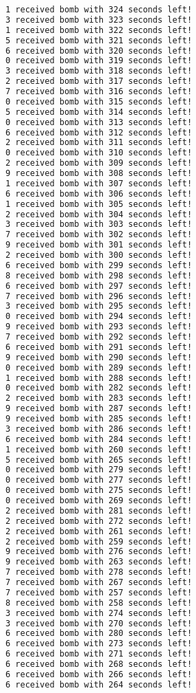 \documentclass{article}
\begin{document}
\begin{lstlisting}[language=bash]
1 received bomb with 324 seconds left!
3 received bomb with 323 seconds left!
1 received bomb with 322 seconds left!
5 received bomb with 321 seconds left!
6 received bomb with 320 seconds left!
0 received bomb with 319 seconds left!
3 received bomb with 318 seconds left!
2 received bomb with 317 seconds left!
7 received bomb with 316 seconds left!
0 received bomb with 315 seconds left!
5 received bomb with 314 seconds left!
0 received bomb with 313 seconds left!
6 received bomb with 312 seconds left!
2 received bomb with 311 seconds left!
0 received bomb with 310 seconds left!
2 received bomb with 309 seconds left!
9 received bomb with 308 seconds left!
1 received bomb with 307 seconds left!
6 received bomb with 306 seconds left!
1 received bomb with 305 seconds left!
2 received bomb with 304 seconds left!
3 received bomb with 303 seconds left!
7 received bomb with 302 seconds left!
9 received bomb with 301 seconds left!
2 received bomb with 300 seconds left!
6 received bomb with 299 seconds left!
8 received bomb with 298 seconds left!
6 received bomb with 297 seconds left!
7 received bomb with 296 seconds left!
3 received bomb with 295 seconds left!
0 received bomb with 294 seconds left!
9 received bomb with 293 seconds left!
7 received bomb with 292 seconds left!
6 received bomb with 291 seconds left!
9 received bomb with 290 seconds left!
0 received bomb with 289 seconds left!
1 received bomb with 288 seconds left!
0 received bomb with 282 seconds left!
2 received bomb with 283 seconds left!
9 received bomb with 287 seconds left!
9 received bomb with 285 seconds left!
3 received bomb with 286 seconds left!
6 received bomb with 284 seconds left!
1 received bomb with 260 seconds left!
5 received bomb with 265 seconds left!
0 received bomb with 279 seconds left!
0 received bomb with 277 seconds left!
0 received bomb with 275 seconds left!
0 received bomb with 269 seconds left!
2 received bomb with 281 seconds left!
2 received bomb with 272 seconds left!
2 received bomb with 261 seconds left!
2 received bomb with 259 seconds left!
9 received bomb with 276 seconds left!
9 received bomb with 263 seconds left!
7 received bomb with 278 seconds left!
7 received bomb with 267 seconds left!
7 received bomb with 257 seconds left!
8 received bomb with 258 seconds left!
3 received bomb with 274 seconds left!
3 received bomb with 270 seconds left!
6 received bomb with 280 seconds left!
6 received bomb with 273 seconds left!
6 received bomb with 271 seconds left!
6 received bomb with 268 seconds left!
6 received bomb with 266 seconds left!
6 received bomb with 264 seconds left!

\end{lstlisting}
\end{document}
